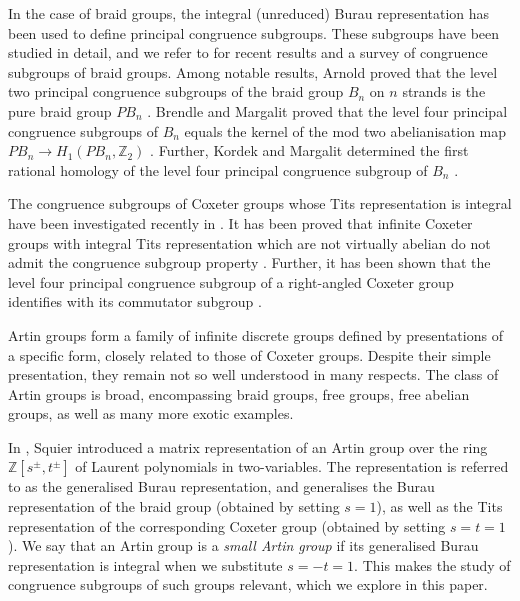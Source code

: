 \documentclass[12pt]{amsart}
\theoremstyle{definition}
\numberwithin{equation}{section}
\begin{document}
 In the case of braid groups, the integral (unreduced) Burau representation has been used to define principal congruence subgroups. These subgroups have been studied in detail, and we refer to \cite{quotientbraid, MR4811535, MR4157115, MR3757477, MR3786423} for recent results and a survey of congruence subgroups of braid groups.  Among notable results, Arnold proved that the level two principal congruence subgroups of the braid group $B_n$ on $n$ strands is the pure braid group $PB_n$ \cite{MR0244266}.  Brendle and Margalit proved that the level four principal congruence subgroups of $B_n$ equals the kernel of the mod two abelianisation map $PB_n \to H_1(PB_n,\mathbb Z_2)$ \cite[Main Theorem]{MR3757477}. Further, Kordek and Margalit determined the first rational homology of the level four principal congruence subgroup of $B_n$ \cite{MR4462681}.
 \par
 
The congruence subgroups of Coxeter groups whose Tits representation is integral have been investigated recently in \cite{mypaper1}. It has been proved that infinite Coxeter groups with integral Tits representation which are not virtually abelian do not admit the congruence subgroup property \cite[Theorem 3.8]{mypaper1}. Further, it has been shown that the level four principal congruence subgroup of a right-angled Coxeter group identifies with its commutator subgroup \cite[Proposition 3.5]{mypaper1}. 
\par
  
Artin groups form a family of infinite discrete groups defined by presentations of a specific form, closely related to those of Coxeter groups. Despite their simple presentation, they remain not so well understood in many respects. The class of Artin groups is broad, encompassing braid groups, free groups, free abelian groups, as well as many more exotic examples.
\par

In \cite{MR0938643}, Squier introduced a matrix representation of an Artin group over the ring $\mathbb Z[s^{\pm}, t^{\pm}]$ of Laurent polynomials in two-variables. 
The representation is referred to as the generalised Burau representation, and generalises the Burau representation of the braid group (obtained by setting $s=1$),
 as well as the Tits representation of the corresponding Coxeter group (obtained by setting  $s =t= 1$). We say that an Artin group is a {\it small Artin group} if its generalised Burau representation is integral when we substitute $s=-t=1$. This makes the study of congruence subgroups of such groups relevant, which we explore in this paper.
\par
\end{document}
